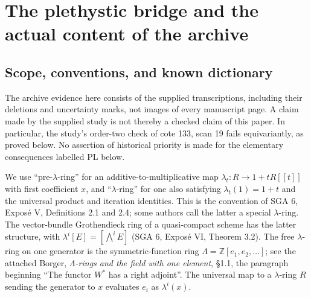 \documentclass[11pt,a4paper]{article}
\begin{document}
\section{The plethystic bridge and the actual content of the archive}
\label{sec:plethysm-bridge}

\subsection{Scope, conventions, and known dictionary}
The archive evidence here consists of the supplied transcriptions, including their
deletions and uncertainty marks, not images of every manuscript page. A claim made
by the supplied study is not thereby a checked claim of this paper. In particular,
the study's order-two check of cote 133, scan 19 fails equivariantly, as proved
below. No assertion of historical priority is made for the elementary consequences
labelled PL below.

We use ``pre-$\lambda$-ring'' for an additive-to-multiplicative map
$\lambda_t:R\longrightarrow 1+tR[[t]]$ with first coefficient $x$, and
``$\lambda$-ring'' for one also satisfying $\lambda_t(1)=1+t$ and the
universal product and iteration identities. This is the convention of SGA 6, Expos\'e V,
Definitions 2.1 and 2.4; some authors call the latter a special $\lambda$-ring.
The vector-bundle Grothendieck ring of a quasi-compact scheme has the latter
structure, with $\lambda^i[E]=[\bigwedge^iE]$ (SGA 6, Expos\'e VI,
Theorem 3.2). The free $\lambda$-ring on one generator is the symmetric-function
ring $\Lambda=\mathbb Z[e_1,e_2,\ldots]$; see the attached Borger,
\emph{$\Lambda$-rings and the field with one element}, \S1.1, the paragraph
beginning ``The functor $W^*$ has a right adjoint''. The universal map to a
$\lambda$-ring $R$ sending the generator to $x$ evaluates $e_i$ as $\lambda^i(x)$.
\end{document}
